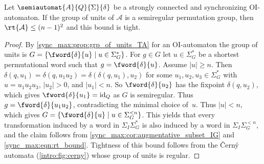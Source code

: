 \begin{corollary} \label{sync_max:cor:aug:bounds:semiregular} 
	Let $\semiautomat{A}{Q}{\Sigma}{\delta}$ be a strongly connected and synchronizing OI-automaton.
	If the group of units of $\mathcal A$ is a semiregular permutation group,
	then $\rt{\mathcal A} \le (n-1)^2$ and this bound is tight.
\end{corollary}
\begin{proof}
	By \cref{sync_max:prop:grp_of_units_TA} for an OI-automaton the group of 
	units is $G = \{ \fword{\delta}{u} \mid u \in \Sigma_G^* \}$.
	For $g \in G$ let $u \in \Sigma_G^*$ be a shortest permutational word
	such that $g = \fword{\delta}{u}$.	
	Assume $|u| \ge n$. 
	Then $\delta(q, u_1) = \delta(q, u_1 u_2) = \delta(\delta(q, u_1), u_2)$
	for some $u_1, u_2, u_3 \in \Sigma_G^*$
	with $u = u_1 u_2 u_3$, $|u_2| > 0$, and $|u_1| < n$. So $\fword{\delta}{u_2}$
	has the fixpoint $\delta(q, u_2)$,
	which gives $\fword{\delta}{u_1} = \operatorname{id}_{Q}$
	as $G$ is semiregular.
	Thus $g = \fword{\delta}{u_1 u_2}$, contradicting the minimal choice of~$u$.
	Thus $|u| < n$, which gives $G = \{ \fword{\delta}{u} \mid u \in \Sigma_G^{< n} \}$.
	This yields that every transformation induced by a word in $\Sigma_I \Sigma_G^*$
	is also induced by a word in $\Sigma_I \Sigma_G^{< n}$,
	and the claim follows from \cref{sync_max:cor:augmentative_subset_IG}
	and \cref{sync_max:eqn:rt_bound}. Tightness of this bound
	follows from the \v{C}ern\'y automata (\cref{intro:fig:cerny})
	whose group of units is regular.
\end{proof}